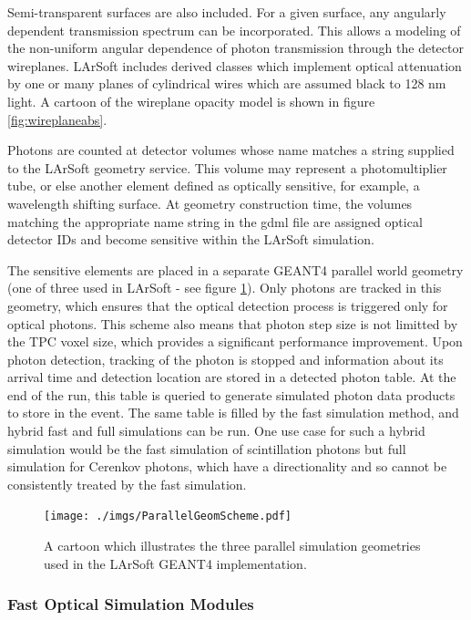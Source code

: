 \documentclass[12pt]{elsarticle}
\begin{document}
Semi-transparent surfaces are also included.  For a given surface, any angularly dependent transmission spectrum can be incorporated.  This allows a modeling of the non-uniform angular dependence of photon transmission through the detector wireplanes.    LArSoft includes derived classes which implement optical attenuation by one or many planes of cylindrical wires which are assumed black to 128 nm light.  A cartoon of the wireplane opacity model is shown in figure \ref{fig:wireplaneabs}.

Photons are counted at detector volumes whose name matches a string supplied to the LArSoft geometry service.  This volume may represent a photomultiplier tube, or else another element defined as optically sensitive, for example, a wavelength shifting surface. At geometry construction time, the volumes matching the appropriate name string in the gdml file are assigned optical detector IDs and become sensitive within the LArSoft simulation.

The sensitive elements are placed in a separate GEANT4 parallel world geometry (one of three used in LArSoft - see figure \ref{fig:parallelgeom}).  Only photons are tracked in this geometry, which ensures that the optical  detection process is triggered only for optical photons.  This scheme also means that photon step size is not limitted by the TPC voxel size, which provides a significant performance improvement. Upon photon detection, tracking of the photon is stopped and information about its arrival time and detection location are stored in a detected photon table.  At the end of the run, this table is queried to generate simulated photon data products to store in the event.  The same table is filled by the fast simulation method, and hybrid fast and full simulations can be run.  One use case for such a hybrid simulation would be the fast simulation of scintillation photons but full simulation for Cerenkov photons, which have a directionality and so cannot be consistently treated by the fast simulation.


\begin{figure}[t]
\centering
\caption{A cartoon which illustrates the three parallel simulation geometries used in the LArSoft
GEANT4 implementation.}
\texttt{[image: ./imgs/ParallelGeomScheme.pdf]}
\label{fig:parallelgeom}
\end{figure}

\subsubsection{Fast Optical Simulation Modules}
\end{document}
